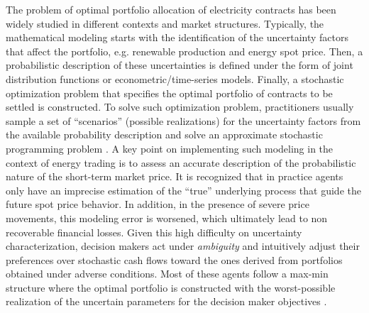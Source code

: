 	The problem of optimal portfolio allocation of electricity contracts has been widely studied in different contexts and market structures. Typically, the mathematical modeling starts with the identification of the uncertainty factors that affect the portfolio, e.g. renewable production and energy spot price. Then, a probabilistic description of these uncertainties is defined under the form of joint distribution functions or econometric/time-series models. Finally, a stochastic optimization problem that specifies the optimal portfolio of contracts to be settled is constructed. To solve such optimization problem, practitioners usually sample a set of ``scenarios'' (possible realizations) for the uncertainty factors from the available probability description and solve an approximate stochastic programming problem \cite{Birge_StochProgm}. A key point on implementing such modeling in the context of energy trading is to assess an accurate description of the probabilistic nature of the short-term market price. It is recognized that in practice agents only have an imprecise estimation of the ``true'' underlying process that guide the future spot price behavior. In addition, in the presence of severe price movements, this modeling error is worsened, which ultimately lead to non recoverable financial losses. Given this high difficulty on uncertainty characterization, decision makers act under \textit{ambiguity} and intuitively adjust their preferences over stochastic cash flows toward the ones derived from portfolios obtained under adverse conditions. Most of these agents follow a max-min structure where the optimal portfolio is constructed with the worst-possible realization of the uncertain parameters for the decision maker objectives \cite{SoftRobustModel_UnderAmb}. 

